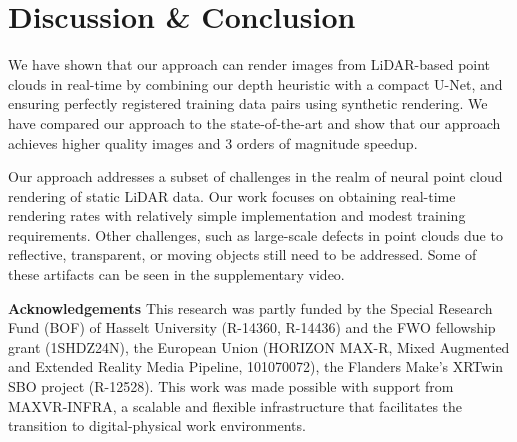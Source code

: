 \documentclass[twocolumn]{article}
\begin{document}
\section{Discussion \& Conclusion}
We have shown that our approach can render images from LiDAR-based point clouds in real-time by combining our depth heuristic with a compact U-Net, and ensuring perfectly registered training data pairs using synthetic rendering. We have compared our approach to the state-of-the-art and show that our approach achieves higher quality images and 3 orders of magnitude speedup.

Our approach addresses a subset of challenges in the realm of neural point cloud rendering of static LiDAR data. Our work focuses on obtaining real-time rendering rates with relatively simple implementation and modest training requirements. Other challenges, such as large-scale defects in point clouds due to reflective, transparent, or moving objects still need to be addressed. Some of these artifacts can be seen in the supplementary video.


\textbf{Acknowledgements}
This research was partly funded by the Special Research Fund (BOF) of Hasselt University (R-14360, R-14436) and the FWO fellowship grant (1SHDZ24N), the European Union (HORIZON MAX-R,
Mixed Augmented and Extended Reality Media Pipeline, 101070072), the Flanders Make’s XRTwin SBO project (R-12528). This work was made possible with support from MAXVR-INFRA, a scalable and flexible infrastructure that facilitates the transition to digital-physical work environments.
\printbibliography 
\end{document}
